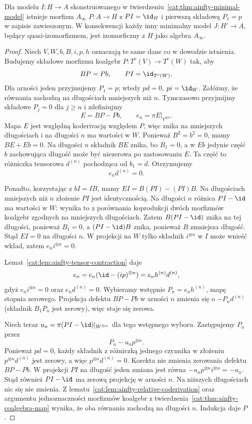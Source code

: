 \begin{twierdzenie}\label{cat:thm:ainfty-minimal-unique}
Dla modelu $I:H\to A$ skonstruowanego w twierdzeniu~\ref{cat:thm:ainfty-minimal-model} istnieje morfizm $A_\infty$ $P:A\to H$ z $PI=\id_H$ i pierwszą składową $P_1=p$ w zapisie zawieszonym. W konsekwencji każdy inny minimalny model $J:H'\to A$, będący quasi-izomorfizmem, jest izomorficzny z $H$ jako algebra $A_\infty$.
\end{twierdzenie}
\begin{proof}
Niech $V,W,b,B,i,p,h$ oznaczają te same dane co w dowodzie istnienia. Budujemy składowe morfizmu koalgebr $P:T^c(V)\to T^c(W)$ tak, aby
\[
 BP=Pb,\qquad PI=\id_{T^c(W)}.
\]
Dla arności jeden przyjmujemy $P_1=p$; wtedy $pd=0$, $pi=\id_W$. Załóżmy, że równania zachodzą na długościach mniejszych niż $n$. Tymczasowo przyjmijmy składowe $P_j=0$ dla $j\geq n$ i zdefiniujmy
\[
 E=BP-Pb,\qquad e_n=\pi E|_{V^{\otimes n}}.
\]
Mapa $E$ jest względną koderivacją względem $P$, więc znika na mniejszych długościach i na długości $n$ ma wartości w $W$. Ponieważ $B^2=b^2=0$, mamy $BE+Eb=0$. Na długości $n$ składnik $BE$ znika, bo $B_1=0$, a w $Eb$ jedynie część $b$ zachowująca długość może być niezerowa po zastosowaniu $E$. Ta część to różniczka tensorowa $d^{(n)}$ pochodząca od $b_1=d$. Otrzymujemy
\[
 e_n d^{(n)}=0.
\]

Ponadto, korzystając z $bI=IB$, mamy $EI=B(PI)-(PI)B$. Na długościach mniejszych niż $n$ złożenie $PI$ jest identycznością. Na długości $n$ różnica $PI-\id$ ma wartości w $W$: wynika to z porównania koprodukcji dwóch morfizmów koalgebr zgodnych na mniejszych długościach. Zatem $B(PI-\id)$ znika na tej długości, ponieważ $B_1=0$, a $(PI-\id)B$ znika, ponieważ $B$ zmniejsza długość. Stąd $EI=0$ na długości $n$. W projekcji na $W$ tylko składnik $i^{\otimes n}$ w $I$ może wnieść wkład, zatem $e_n i^{\otimes n}=0$.

Lemat~\ref{cat:lem:ainfty-tensor-contraction} daje
\[
 e_n=e_n(\id-(ip)^{\otimes n})
 =e_n h^{(n)} d^{(n)},
\]
gdyż $e_n i^{\otimes n}=0$ oraz $e_n d^{(n)}=0$. Wybieramy wstępnie $P_n=e_n h^{(n)}$, mapę stopnia zerowego. Projekcja defektu $BP-Pb$ w arności $n$ zmienia się o $-P_n d^{(n)}$ (składnik $B_1P_n$ jest zerowy), więc staje się zerowa.

Niech teraz $u_n=\pi(PI-\id)|_{W^{\otimes n}}$ dla tego wstępnego wyboru. Zastępujemy $P_n$ przez
\[
 P_n-u_n p^{\otimes n}.
\]
Ponieważ $pd=0$, każdy składnik z różniczką jednego czynnika w złożeniu $p^{\otimes n}d^{(n)}$ jest zerowy, a więc $p^{\otimes n}d^{(n)}=0$. Korekta nie zmienia zerowania defektu $BP-Pb$. W projekcji $PI$ na długość jeden zmiana jest równa $-u_n p^{\otimes n}i^{\otimes n}=-u_n$. Stąd również $PI-\id$ ma zerową projekcję w arności $n$. Na niższych długościach nic się nie zmienia. Z lematu~\ref{cat:lem:ainfty-relative-coderivation} oraz argumentu jednoznaczności morfizmów koalgebr z twierdzenia~\ref{cat:thm:ainfty-coalgebra-map} wynika, że oba równania zachodzą na długości $n$. Indukcja daje $P$.


\end{proof}
